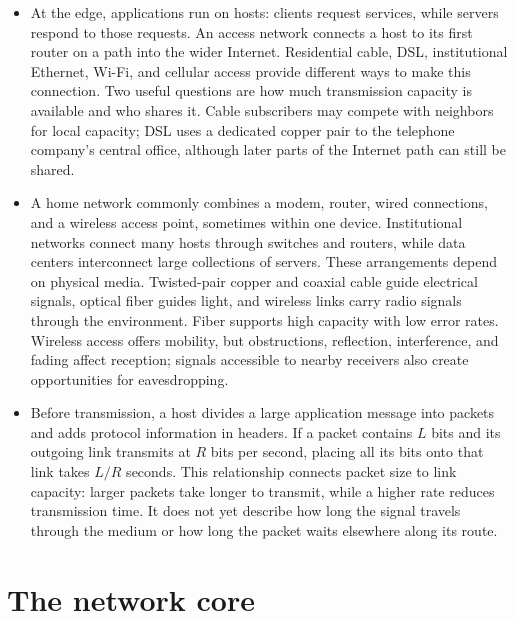 \documentclass[10pt]{article}
\begin{document}
\begin{itemize}[leftmargin=1.25em, itemsep=0.3em, parsep=0pt, topsep=0pt]
    \item At the edge, applications run on hosts: clients request services, while servers respond to those requests. An access network connects a host to its first router on a path into the wider Internet. Residential cable, DSL, institutional Ethernet, Wi-Fi, and cellular access provide different ways to make this connection. Two useful questions are how much transmission capacity is available and who shares it. Cable subscribers may compete with neighbors for local capacity; DSL uses a dedicated copper pair to the telephone company's central office, although later parts of the Internet path can still be shared.

    \item A home network commonly combines a modem, router, wired connections, and a wireless access point, sometimes within one device. Institutional networks connect many hosts through switches and routers, while data centers interconnect large collections of servers. These arrangements depend on physical media. Twisted-pair copper and coaxial cable guide electrical signals, optical fiber guides light, and wireless links carry radio signals through the environment. Fiber supports high capacity with low error rates. Wireless access offers mobility, but obstructions, reflection, interference, and fading affect reception; signals accessible to nearby receivers also create opportunities for eavesdropping.

    \item Before transmission, a host divides a large application message into packets and adds protocol information in headers. If a packet contains \(L\) bits and its outgoing link transmits at \(R\) bits per second, placing all its bits onto that link takes \(L/R\) seconds. This relationship connects packet size to link capacity: larger packets take longer to transmit, while a higher rate reduces transmission time. It does not yet describe how long the signal travels through the medium or how long the packet waits elsewhere along its route.
\end{itemize}

\section*{The network core}
\end{document}
